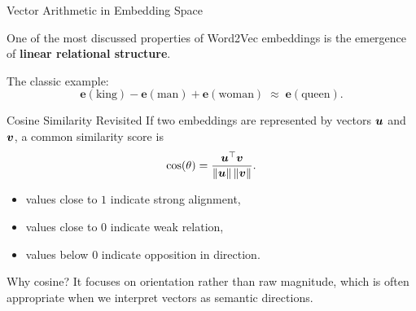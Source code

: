 \documentclass[11pt,aspectratio=169,professionalfonts]{beamer}
\begin{document}
%
%
\begin{frame}{Vector Arithmetic in Embedding Space}
 
One of the most discussed properties of Word2Vec embeddings is the emergence
of \textbf{linear relational structure}.
 
\medskip
 
The classic example:
\[
  \mathbf{e}(\text{king}) - \mathbf{e}(\text{man}) + \mathbf{e}(\text{woman})
  \;\approx\; \mathbf{e}(\text{queen}).
\]
 
\begin{center}
\end{center}
 
\end{frame}
%
%
\begin{frame}{Cosine Similarity Revisited}
If two embeddings are represented by vectors $\bm{u}$ and $\bm{v}$, a common similarity score is
\[
\cos(\theta) = \frac{\bm{u}^{\top}\bm{v}}{\|\bm{u}\|\,\|\bm{v}\|}.
\]

\vspace{0.2cm}
\begin{itemize}
    \item values close to $1$ indicate strong alignment,
    \item values close to $0$ indicate weak relation,
    \item values below $0$ indicate opposition in direction.
\end{itemize}

\vspace{0.2cm}
\begin{block}{Why cosine?}
It focuses on orientation rather than raw magnitude, which is often appropriate when we interpret vectors as semantic directions.
\end{block}
\end{frame}
\end{document}
